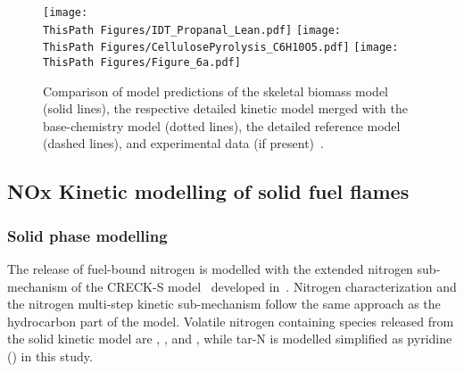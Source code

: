 \begin{btUnit}
\begin{figure}[h]
    \texttt{[image: \\ThisPath Figures/IDT\_Propanal\_Lean.pdf]}
    \texttt{[image: \\ThisPath Figures/CellulosePyrolysis\_C6H10O5.pdf]}
    \texttt{[image: \\ThisPath Figures/Figure\_6a.pdf]}
    \caption{Comparison of model predictions of the skeletal biomass model (solid lines), the respective detailed kinetic model merged with the base-chemistry model (dotted lines), the detailed reference model (dashed lines), and experimental data (if present)~\cite{Pelucchi2015, Chen2022}.}\label{fig:B3BioMechValidation}
\end{figure}


\newpage
\subsection{NOx Kinetic modelling of solid fuel flames}

\subsubsection{Solid phase modelling}
The release of fuel-bound nitrogen is modelled with the extended nitrogen sub-mechanism of the CRECK-S model~\cite{Debiagi2017} developed in~. Nitrogen characterization and the nitrogen multi-step kinetic sub-mechanism follow the same approach as the hydrocarbon part of the model. Volatile nitrogen containing species released from the solid kinetic model are , , and , while tar-N is modelled simplified as pyridine () in this study.


\end{btUnit}
